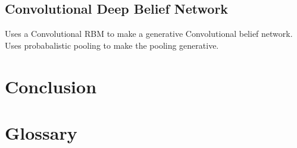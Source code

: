 \documentclass[11pt]{article}
\begin{document}
\subsection{Convolutional Deep Belief Network}

Uses a Convolutional RBM to make a generative Convolutional belief network.
Uses probabalistic pooling to make the pooling generative.

\section{Conclusion}

\appendix

\section{Glossary}





\end{document}
